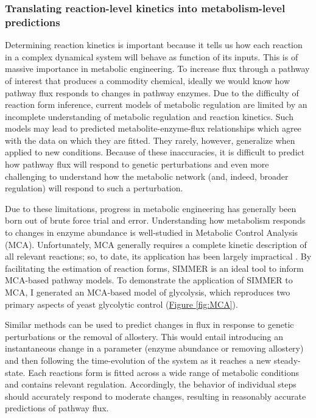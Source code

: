 \subsubsection{Translating reaction-level kinetics into metabolism-level predictions}

Determining reaction kinetics is important because it tells us how each reaction in a complex dynamical system will behave as function of its inputs. This is of massive importance in metabolic engineering. To increase flux through a pathway of interest that produces a commodity chemical, ideally we would know how pathway flux responds to changes in pathway enzymes. Due to the difficulty of reaction form inference, current models of metabolic regulation are limited by an incomplete understanding of metabolic regulation and reaction kinetics. Such models may lead to predicted metabolite-enzyme-flux relationships which agree with the data on which they are fitted. They rarely, however, generalize when applied to new conditions. Because of these inaccuracies, it is difficult to predict how pathway flux will respond to genetic perturbations and even more challenging to understand how the metabolic network (and, indeed, broader regulation) will respond to such a perturbation. 

Due to these limitations, progress in metabolic engineering has generally been born out of brute force trial and error. Understanding how metabolism responds to changes in enzyme abundance is well-studied in Metabolic Control Analysis (MCA). Unfortunately, MCA generally requires a complete kinetic description of all relevant reactions; so, to date, its application has been largely impractical \cite{Kacser:1973fe, Fell:1997wg}. By facilitating the estimation of reaction forms, SIMMER is an ideal tool to inform MCA-based pathway models. To demonstrate the application of SIMMER to MCA, I generated an MCA-based model of glycolysis, which reproduces two primary aspects of yeast glycolytic control (\hyperref[fig:MCA]{Figure \ref{fig:MCA}}).

Similar methods can be used to predict changes in flux in response to genetic perturbations or the removal of allostery. This would entail introducing an instantaneous change in a parameter (enzyme abundance or removing allostery) and then following the time-evolution of the system as it reaches a new steady-state. Each reactions form is fitted across a wide range of metabolic conditions and contains relevant regulation. Accordingly, the behavior of individual steps should accurately respond to moderate changes, resulting in reasonably accurate predictions of pathway flux.

